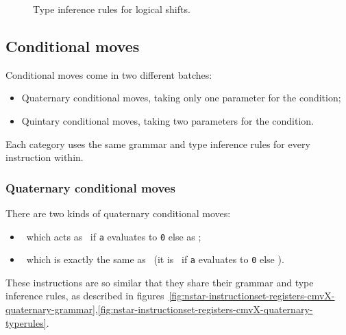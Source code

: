 \begin{figure}[H]
	\centering


	\caption{Type inference rules for logical shifts.}
	\label{fig:nstar-instructionset-registers-logical-shifts-typerules}
\end{figure}

\subsection{Conditional moves}\label{subsec:nstar-instructionset-registers-cmvX}

Conditional moves come in two different batches:
\begin{itemize}
	\item Quaternary conditional moves, taking only one parameter for the condition;
	\item Quintary conditional moves, taking two parameters for the condition.
\end{itemize}
Each category uses the same grammar and type inference rules for every instruction within.

\subsubsection{Quaternary conditional moves}\label{subsubsec:nstar-instructionset-registers-cmvX-quaternary}

There are two kinds of quaternary conditional moves:
\begin{itemize}
	\item {}\ which acts as \ if \texttt{a} evaluates to \texttt{0} else as ;
	\item {}\ which is exactly the same as \ (it is \ if \texttt{a} evaluates to \texttt{0} else ).
\end{itemize}

These instructions are so similar that they share their grammar and type inference rules, as described in figures~\ref{fig:nstar-instructionset-registers-cmvX-quaternary-grammar},\ref{fig:nstar-instructionset-registers-cmvX-quaternary-typerules}.

